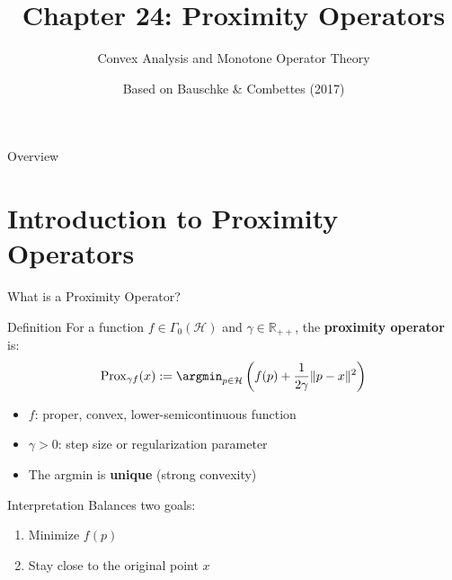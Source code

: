 \documentclass[aspectratio=169,10pt]{beamer}
\title{Chapter 24: Proximity Operators}
\subtitle{Convex Analysis and Monotone Operator Theory}
\author{Based on Bauschke \& Combettes (2017)}
\date{}
\begin{document}
\begin{frame}
\titlepage
\end{frame}

\begin{frame}[allowframebreaks]{Overview}
\tableofcontents
\end{frame}

\section{Introduction to Proximity Operators}

\begin{frame}{What is a Proximity Operator?}
\begin{block}{Definition}
For a function $f \in \Gamma_0(\mathcal{H})$ and $\gamma \in \mathbb{R}_{++}$, the \textbf{proximity operator} is:
\[
\mathrm{Prox}_{\gamma f}(x) := \argmin_{p \in \mathcal{H}} \left( f(p) + \frac{1}{2\gamma}\|p - x\|^2 \right)
\]
\end{block}

\vspace{0.3cm}

\begin{itemize}
    \item $f$: proper, convex, lower-semicontinuous function
    \item $\gamma > 0$: step size or regularization parameter
    \item The argmin is \textbf{unique} (strong convexity)
\end{itemize}

\vspace{0.3cm}

\begin{exampleblock}{Interpretation}
Balances two goals:
\begin{enumerate}
    \item Minimize $f(p)$
    \item Stay close to the original point $x$
\end{enumerate}
\end{exampleblock}
\end{frame}
\end{document}

